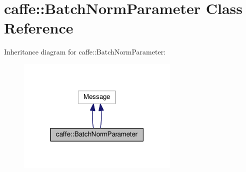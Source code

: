 \hypertarget{classcaffe_1_1_batch_norm_parameter}{}\section{caffe\+:\+:Batch\+Norm\+Parameter Class Reference}
\label{classcaffe_1_1_batch_norm_parameter}


Inheritance diagram for caffe\+:\+:Batch\+Norm\+Parameter\+:
\nopagebreak
\begin{figure}[H]
\begin{center}
\leavevmode
\includegraphics[width=219pt]{classcaffe_1_1_batch_norm_parameter__inherit__graph}
\end{center}
\end{figure}

